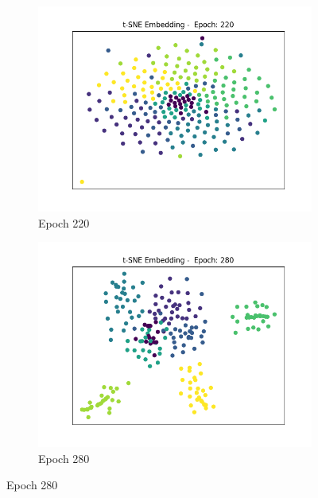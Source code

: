 		\begin{figure}[!ht]
			\centering
			\begin{subfigure}{0.3\textwidth}
				\centering
				\includegraphics[width=1.1\linewidth]{images/plotE6_tSNE_e220_MSRC_9_E_GDL_22_00h-05mExp3pullpush}
				\caption{Epoch 220}
				\label{fig:plote6tsnee220msrc9egdl2200h-05mexp3pullpush}
			\end{subfigure}		
			\begin{subfigure}{0.3\textwidth}
				\centering
				\includegraphics[width=1.1\linewidth]{images/plotE6_tSNE_e280__MSRC_9_E_GDL_22_00h-05mExp3pullpush}
				\caption{Epoch 280}
				\label{fig:plote6tsnee280msrc9egdl2200h-05mexp3pullpush}
			\end{subfigure}

\end{figure}
